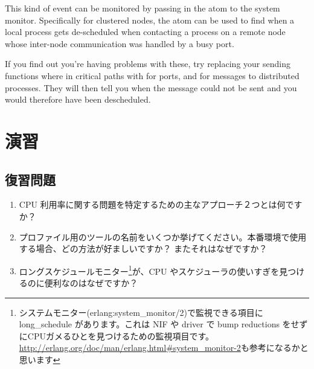 This kind of event can be monitored by passing in the atom  to the system monitor. Specifically for clustered nodes, the atom  can be used to find when a local process gets de-scheduled when contacting a process on a remote node whose inter-node communication was handled by a busy port.

If you find out you're having problems with these, try replacing your sending functions where in critical paths with  for ports, and  for messages to distributed processes. They will then tell you when the message could not be sent and you would therefore have been descheduled.


\section{演習}

\subsection*{復習問題}

\begin{enumerate}
	\item CPU 利用率に関する問題を特定するための主なアプローチ２つとは何ですか？
	\item プロファイル用のツールの名前をいくつか挙げてください。本番環境で使用する場合、どの方法が好ましいですか？ またそれはなぜですか？
  \item ロングスケジュールモニター\footnote{システムモニター(erlang:system\_monitor/2)で監視できる項目に long\_schedule があります。これは NIF や driver で bump reductions をせずにCPUガメるひとを見つけるための監視項目です。\href{http://erlang.org/doc/man/erlang.html\#system\_monitor-2}{http://erlang.org/doc/man/erlang.html\#system\_monitor-2}も参考になるかと思います}が、CPU やスケジューラの使いすぎを見つけるのに便利なのはなぜですか？

\end{enumerate}

